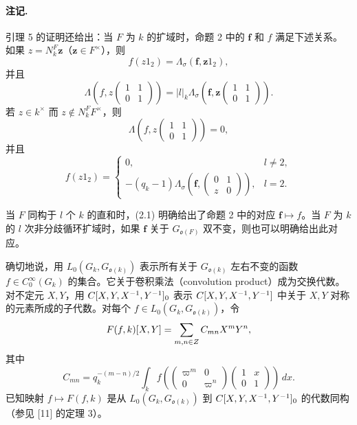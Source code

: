 \paragraph*{注记.}
引理 5 的证明还给出：当 $F$ 为 $k$ 的扩域时，命题 2 中的 $\boldsymbol f$ 和 $f$ 满足下述关系。如果 $z=N_k^F\boldsymbol z$（$\boldsymbol z\in F^\times$），则
\[
 f(z1_2)=\Lambda_\sigma(\boldsymbol f,\boldsymbol z1_2),
\]
并且
\[
 \Lambda\left(f,z\begin{pmatrix}1&1\\0&1\end{pmatrix}\right)
 =|l|_k\Lambda_\sigma\left(\boldsymbol f,
 \boldsymbol z\begin{pmatrix}1&1\\0&1\end{pmatrix}\right).
\]
若 $z\in k^\times$ 而 $z\notin N_k^FF^\times$，则
\[
 \Lambda\left(f,z\begin{pmatrix}1&1\\0&1\end{pmatrix}\right)=0,
\]
并且
\[
 f(z1_2)=\begin{cases}
 0,&l\ne2,\\
 -(q_k-1)\Lambda_\sigma\left(\boldsymbol f,\begin{pmatrix}0&1\\z&0\end{pmatrix}\right),&l=2.
 \end{cases}
\]

当 $F$ 同构于 $l$ 个 $k$ 的直和时，(2.1) 明确给出了命题 2 中的对应 $\boldsymbol f\mapsto f$。当 $F$ 为 $k$ 的 $l$ 次非分歧循环扩域时，如果 $\boldsymbol f$ 关于 $G_{\mathfrak o(F)}$ 双不变，则也可以明确给出此对应。

确切地说，用 $L_0(G_k,G_{\mathfrak o(k)})$ 表示所有关于 $G_{\mathfrak o(k)}$ 左右不变的函数 $f\in C_0^\infty(G_k)$ 的集合。它关于卷积乘法（convolution product）成为交换代数。对不定元 $X,Y$，用 $C[X,Y,X^{-1},Y^{-1}]_0$ 表示 $C[X,Y,X^{-1},Y^{-1}]$ 中关于 $X,Y$ 对称的元素所成的子代数。对每个 $f\in L_0(G_k,G_{\mathfrak o(k)})$，令
\[
 F(f,k)[X,Y]=\sum_{m,n\in Z}C_{mn}X^mY^n,
\]
其中
\[
 C_{mn}=q_k^{-(m-n)/2}\int_k
 f\left(\begin{pmatrix}\varpi^m&0\\0&\varpi^n\end{pmatrix}
 \begin{pmatrix}1&x\\0&1\end{pmatrix}\right)\,dx.
\]
已知映射 $f\mapsto F(f,k)$ 是从 $L_0(G_k,G_{\mathfrak o(k)})$ 到 $C[X,Y,X^{-1},Y^{-1}]_0$ 的代数同构（参见 [11] 的定理 3）。


